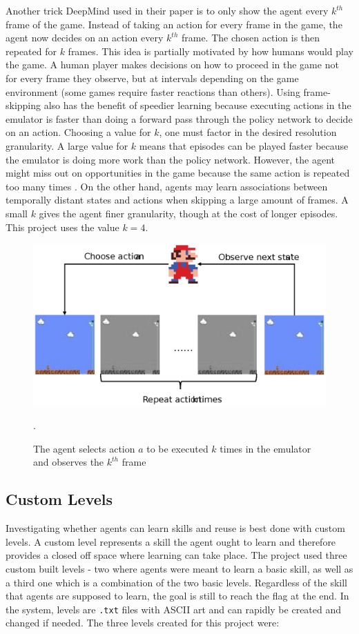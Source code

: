 \documentclass[notitlepage,a4paper,11pt]{article}
\begin{document}
Another trick DeepMind used in their paper is to only show the agent every $k^{th}$ frame of the game. Instead of taking an action for every frame in the game, the agent now decides on an action every $k^{th}$ frame. The chosen action is then repeated for $k$ frames. This idea is partially motivated by how humans would play the game. A human player makes decisions on how to proceed in the game not for every frame they observe, but at intervals depending on the game environment (some games require faster reactions than others). Using frame-skipping also has the benefit of speedier learning because executing actions in the emulator is faster than doing a forward pass through the policy network to decide on an action. Choosing a value for $k$, one must factor in the desired resolution granularity. A large value for $k$ means that episodes can be played faster because the emulator is doing more work than the policy network. However, the agent might miss out on opportunities in the game because the same action is repeated too many times \cite{braylan2015frame}. On the other hand, agents may learn associations between temporally distant states and actions when skipping a large amount of frames. A small $k$ gives the agent finer granularity, though at the cost of longer episodes. This project uses the value $k = 4$.

\begin{figure}[!htb]
\centering
\includegraphics[trim={0 4cm 0 4cm}, clip, width=1\linewidth]{figs/frame_skipping.eps}
\caption{The agent selects action $a$ to be executed $k$ times in the emulator and observes the $k^{th}$ frame}.
\end{figure}

\subsection{Custom Levels}\label{custom_levels}
Investigating whether agents can learn skills and reuse is best done with custom levels. A custom level represents a skill the agent ought to learn and therefore provides a closed off space where learning can take place. The project used three custom built levels - two where agents were meant to learn a basic skill, as well as a third one which is a combination of the two basic levels. Regardless of the skill that agents are supposed to learn, the goal is still to reach the flag at the end. In the system, levels are \texttt{.txt} files with ASCII art and can rapidly be created and changed if needed. The three levels created for this project were:
\end{document}
